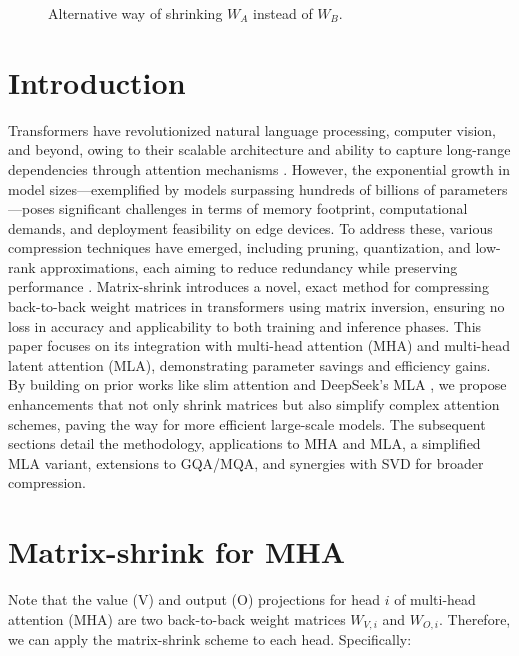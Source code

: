 \documentclass{article}
\begin{document}
\begin{figure}[h]
\centering
\caption{Alternative way of shrinking $W_A$ instead of $W_B$.}
\label{fig:fig2}
\end{figure}

\section{Introduction}
Transformers have revolutionized natural language processing, computer vision, and beyond, owing to their scalable architecture and ability to capture long-range dependencies through attention mechanisms \cite{vaswani2017attention}. However, the exponential growth in model sizes---exemplified by models surpassing hundreds of billions of parameters---poses significant challenges in terms of memory footprint, computational demands, and deployment feasibility on edge devices. To address these, various compression techniques have emerged, including pruning, quantization, and low-rank approximations, each aiming to reduce redundancy while preserving performance \cite{arxiv2023survey}. Matrix-shrink introduces a novel, exact method for compressing back-to-back weight matrices in transformers using matrix inversion, ensuring no loss in accuracy and applicability to both training and inference phases. This paper focuses on its integration with multi-head attention (MHA) and multi-head latent attention (MLA), demonstrating parameter savings and efficiency gains. By building on prior works like slim attention \cite{graef2025slim} and DeepSeek's MLA \cite{deepseek2024}, we propose enhancements that not only shrink matrices but also simplify complex attention schemes, paving the way for more efficient large-scale models. The subsequent sections detail the methodology, applications to MHA and MLA, a simplified MLA variant, extensions to GQA/MQA, and synergies with SVD for broader compression.

\section{Matrix-shrink for MHA}
Note that the value (V) and output (O) projections for head $i$ of multi-head attention (MHA) are two back-to-back weight matrices $W_{V,i}$ and $W_{O,i}$. Therefore, we can apply the matrix-shrink scheme to each head. Specifically:
\end{document}
